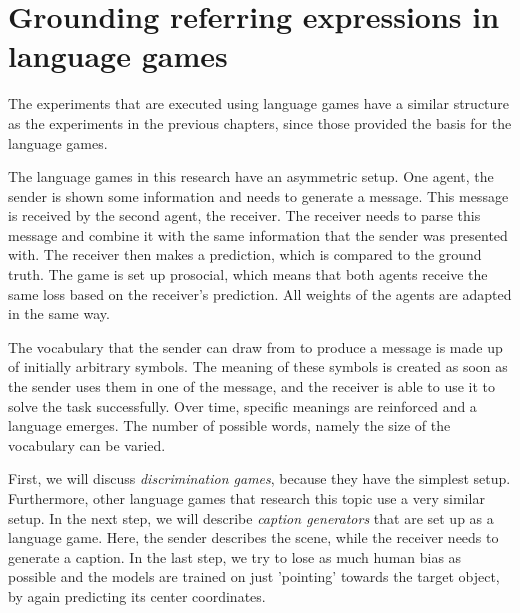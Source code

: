 \section{Grounding referring expressions in language games}
\label{sec:language-games}

The experiments that are executed using language games have a similar structure as the experiments in the previous chapters, since those provided the basis for the language games.

The language games in this research have an asymmetric setup.
One agent, the sender is shown some information and needs to generate a message.
This message is received by the second agent, the receiver.
The receiver needs to parse this message and combine it with the same information that the sender was presented with.
The receiver then makes a prediction, which is compared to the ground truth.
The game is set up prosocial, which means that both agents receive the same loss based on the receiver's prediction.
All weights of the agents are adapted in the same way.

The vocabulary that the sender can draw from to produce a message is made up of initially arbitrary symbols.
The meaning of these symbols is created as soon as the sender uses them in one of the message, and the receiver is able to use it to solve the task successfully.
Over time, specific meanings are reinforced and a language emerges.
The number of possible words, namely the size of the vocabulary can be varied.

First, we will discuss \emph{discrimination games}, because they have the simplest setup.
Furthermore, other language games that research this topic use a very similar setup.
In the next step, we will describe \emph{caption generators} that are set up as a language game.
Here, the sender describes the scene, while the receiver needs to generate a caption.
In the last step, we try to lose as much human bias as possible and the models are trained on just 'pointing' towards the target object, by again predicting its center coordinates.

